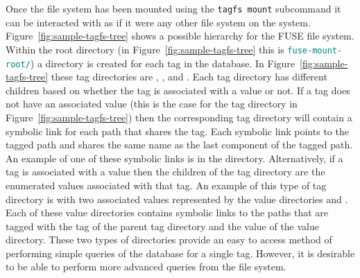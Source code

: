 Once the file system has been mounted using the \texttt{tagfs mount} subcommand
it can be interacted with as if it were any other file system on the system.
Figure~\ref{fig:sample-tagfs-tree} shows a possible hierarchy for the FUSE file
system. Within the root directory (in Figure~\ref{fig:sample-tagfs-tree} this
is \texttt{\textcolor{teal}{fuse-mount-root/}}) a directory is created for each
tag in the database. In Figure~\ref{fig:sample-tagfs-tree} these tag
directories are , ,  and . Each
tag directory has different children based on whether the tag is associated
with a value or not. If a tag does not have an associated value (this is the
case for the  tag directory in
Figure~\ref{fig:sample-tagfs-tree}) then the corresponding tag directory will
contain a symbolic link for each path that shares the tag. Each symbolic link
points to the tagged path and shares the same name as the last component of the
tagged path. An example of one of these symbolic links is 
in the  directory. Alternatively, if a tag is associated with a
value then the children of the tag directory are the enumerated values
associated with that tag. An example of this type of tag directory is
 with two associated values represented by the value directories
 and . Each of these value directories contains symbolic
links to the paths that are tagged with the tag of the parent tag directory and
the value of the value directory. These two types of directories provide an
easy to access method of performing simple queries of the database for a single
tag. However, it is desirable to be able to perform more advanced queries from
the file system.

